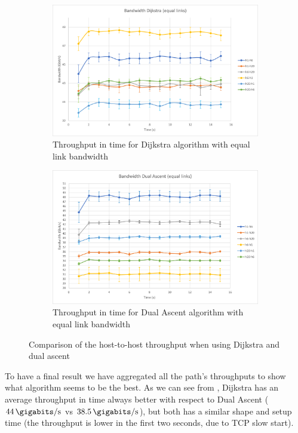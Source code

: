 \begin{figure}
	\centering
	\begin{subfigure}[b]{\textwidth}
		\centering
		\includegraphics[width=\textwidth]{img/band-eq-dijkstra.png}
		\caption{Throughput in time for Dijkstra algorithm with equal
		link bandwidth}\label{subfig:band-eq-dijkstra}
	\end{subfigure}
	\begin{subfigure}[b]{\textwidth}
		\centering
		\includegraphics[width=\textwidth]{img/band-eq-dual.png}
		\caption{Throughput in time for Dual Ascent algorithm with equal
		link bandwidth}\label{subfig:band-eq-dual}
	\end{subfigure}
	\caption{Comparison of the host-to-host throughput when using Dijkstra
	and dual ascent}\label{fig:bandwidth-equallinks}
\end{figure}

To have a final result we have aggregated all the path's throughputs to show
what algorithm seems to be the best. As we can see from
, Dijkstra has an average throughput in time
always better with respect to Dual Ascent (\(\SI{44}{\gigabits\per\second}\) vs
\(\SI{38.5}{\gigabits\per\second}\)), but both has a similar shape and setup time
(the throughput is lower in the first two seconds, due to TCP slow start).

